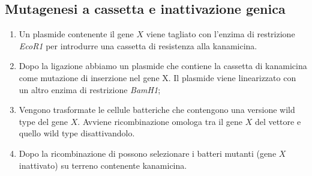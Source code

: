 	\subsection{Mutagenesi a cassetta e inattivazione genica}
	\begin{enumerate}
		\item Un plasmide contenente il gene $X$ viene tagliato con l'enzima di restrizione \emph{EcoR1} per introdurre una cassetta di resistenza alla kanamicina.
	    	\item Dopo la ligazione abbiamo un plasmide che contiene la cassetta di kanamicina come mutazione di inserzione nel gene X. 
			Il plasmide viene linearizzato con un altro enzima di restrizione \emph{BamH1}; 
	    	\item Vengono trasformate le cellule batteriche che contengono una versione wild type del gene $X$.
			Avviene ricombinazione omologa tra il gene $X$ del vettore e quello wild type disattivandolo.
	    	\item Dopo la ricombinazione di possono selezionare i batteri mutanti (gene $X$ inattivato) su terreno contenente kanamicina.
	\end{enumerate}
